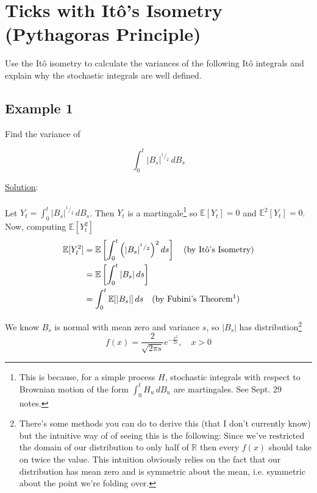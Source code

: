 \documentclass[12pt]{article}
\newlength\tindent
\renewcommand{\indent}{\hspace*{\tindent}}
\begin{document}
\section{Ticks with It\^{o}'s Isometry (Pythagoras Principle)}

\indent Use the It\^{o} isometry to calculate the variances of the following It\^{o} integrals and explain why the stochastic integrals are well defined.

\subsection{Example 1}

Find the variance of

\begin{equation*}
	\int^t_0 |B_s|^{^1/_2}\,dB_s
\end{equation*}

\underline{Solution}: \\
\\
Let $Y_t = \int^t_0 |B_s|^{^1/_2}\,dB_s$. Then $Y_t$ is a martingale\footnote{This is because, for a simple process $H$, stochastic integrals with respect to Brownian motion of the form $\int^t_0 H_u\,dB_u$ are martingales. See Sept. 29 notes.} so $\mathbb E[Y_t] = 0$ and $\mathbb E^2[Y_t] = 0$. \\

Now, computing $\mathbb E[Y_t^2]$
\begin{align*}
	\mathbb E[Y_t^2] &= \mathbb E\left[ \int^t_0 \Big(|B_s|^{^1/_2} \Big)^2\,ds \right] \quad \text{(by It\^{o}'s Isometry)} \\
	&= \mathbb E\left[ \int^t_0 |B_s|\,ds \right] \\
	&= \int^t_0 \mathbb E[|B_s|]\,ds \quad \text{(by Fubini's Theorem\footnotemark)}
\end{align*}

We know $B_s$ is normal with mean zero and variance $s$, so $|B_s|$ has distribution\footnote{There's some methods you can do to derive this (that I don't currently know) but the intuitive way of of seeing this is the following: Since we've restricted the domain of our distribution to only half of $\mathbb R$ then every $f(x)$ should take on twice the value. This intuition obviously relies on the fact that our distribution has mean zero and is symmetric about the mean, i.e. symmetric about the point we're folding over.}
\begin{equation*}
	f(x) = \frac{2}{\sqrt{2\pi s}} e^{-\frac{x^2}{2s}}, \quad x>0
\end{equation*}
\end{document}
